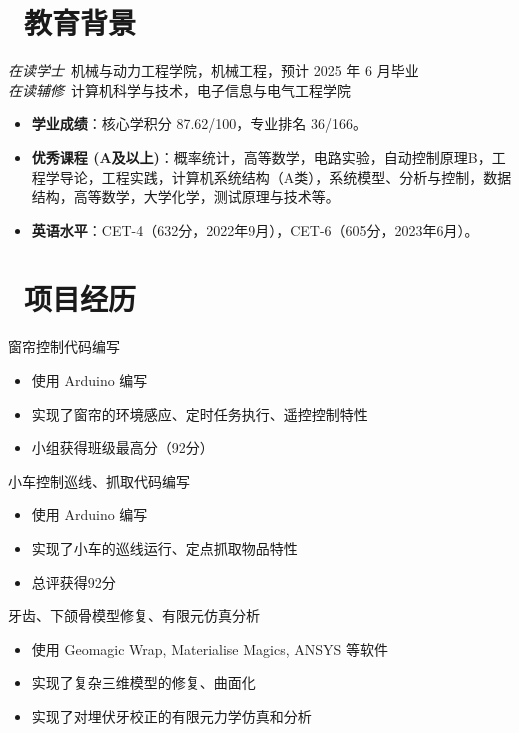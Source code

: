 \documentclass{resume}
\begin{document}


 
\section{\faGraduationCap\  教育背景}
\textit{在读学士}\ 机械与动力工程学院，机械工程，预计 2025 年 6 月毕业\\
\textit{在读辅修}\ 计算机科学与技术，电子信息与电气工程学院
\begin{itemize}
  \item \textbf{学业成绩}：核心学积分 87.62/100，专业排名 36/166。
  \item \textbf{优秀课程 (A及以上)}：概率统计，高等数学\uppercase\expandafter{}，电路实验，自动控制原理B，工程学导论，工程实践，计算机系统结构（A类），系统模型、分析与控制，数据结构，高等数学\uppercase\expandafter{}，大学化学，测试原理与技术等。
  \item \textbf{英语水平}：CET-4（632分，2022年9月），CET-6（605分，2023年6月）。
\end{itemize}


\section{\faUsers\ 项目经历}
窗帘控制代码编写
\begin{itemize}
  \item 使用 Arduino 编写
  \item 实现了窗帘的环境感应、定时任务执行、遥控控制特性
  \item 小组获得班级最高分（92分）
\end{itemize}

小车控制巡线、抓取代码编写
\begin{itemize}
  \item 使用 Arduino 编写
  \item 实现了小车的巡线运行、定点抓取物品特性
  \item 总评获得92分
\end{itemize}

牙齿、下颌骨模型修复、有限元仿真分析
\begin{itemize}
  \item 使用 Geomagic Wrap, Materialise Magics, ANSYS 等软件
  \item 实现了复杂三维模型的修复、曲面化
  \item 实现了对埋伏牙校正的有限元力学仿真和分析
\end{itemize}
\end{document}
